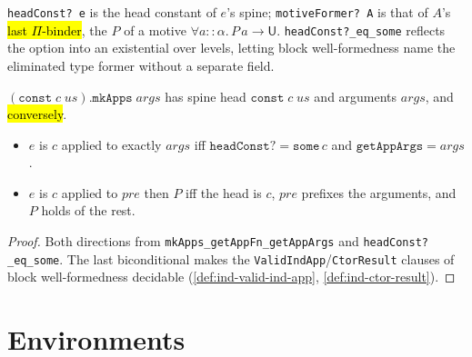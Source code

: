 \begin{definition}
\label{def:headconst}
\leanok
{} 

 \texttt{headConst? e} is the head constant of $e$'s spine;
\texttt{motiveFormer? A} is that of $A$'s \hl{last $\Pi$-binder}, the $P$ of a motive
$\forall a{::}\alpha.\,P\,a \to \mathsf{U}$.
\texttt{headConst?\_eq\_some} reflects the option into an existential over levels,
letting block well-formedness name the eliminated type former without a separate field.
\end{definition}

\begin{lemma}
\label{fam:const-spine}
\leanok
{} 

 $(\texttt{const}\;c\;us).\texttt{mkApps}\;\mathit{args}$ has
spine head $\texttt{const}\;c\;us$ and arguments $\mathit{args}$, and \hl{conversely}.
\begin{itemize}
\item $e$ is $c$ applied to exactly $\mathit{args}$ iff
$\texttt{headConst?}=\texttt{some}\,c$ and $\texttt{getAppArgs}=\mathit{args}$.
\item $e$ is $c$ applied to $\mathit{pre}$ then $P$ iff the head is $c$, $\mathit{pre}$
prefixes the arguments, and $P$ holds of the rest.
\end{itemize}
\end{lemma}
\begin{proof}
\leanok
{} Both directions from \texttt{mkApps\_getAppFn\_getAppArgs} and
\texttt{headConst?\_eq\_some}. The last biconditional makes the
\texttt{ValidIndApp}/\texttt{CtorResult} clauses of block well-formedness decidable
(\ref{def:ind-valid-ind-app}, \ref{def:ind-ctor-result}).
\end{proof}

\section{Environments}

